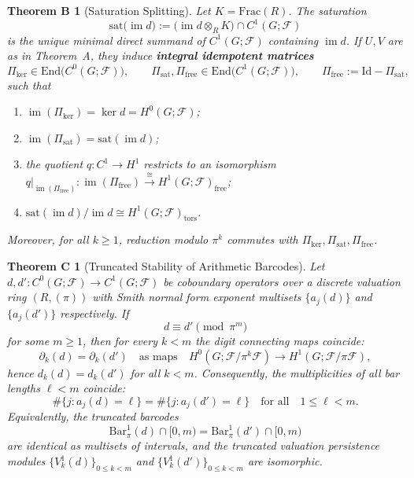 \documentclass[11pt]{amsart}
\theoremstyle{plain}
\newtheorem*{thmB}{Theorem B}
\newtheorem*{thmC}{Theorem C}
\theoremstyle{definition}
\newcommand{\Ring}{R}                          %
\newcommand{\unif}{\pi}                        %
\newcommand{\sheaf}[1]{\mathcal{#1}}                  %
\newcommand{\sat}{\mathrm{sat}}
\newcommand{\free}{\mathrm{free}}
\newcommand{\tors}{\mathrm{tors}}
\newcommand{\Digit}[1]{\partial_{#1}}%
\newcommand{\coboundary}{d}                           %
\DeclareMathOperator{\im}{im}                         %
\begin{document}
\begin{thmB}[Saturation Splitting]
\label{thm:B-saturation}
Let $K=\mathrm{Frac}(\Ring)$. The saturation
\[
\sat\bigl(\im \coboundary\bigr) := \bigl(\im \coboundary \otimes_{\Ring} K\bigr)\cap C^1(G;\sheaf{F})
\]
is the unique minimal direct summand of $C^1(G;\sheaf{F})$ containing $\im \coboundary$. If $U,V$ are as in Theorem~A, they induce \textbf{integral idempotent matrices}
\[
\Pi_{\ker}\in \mathrm{End}\bigl(C^0(G;\sheaf{F})\bigr),\qquad
\Pi_{\sat},\Pi_{\free}\in \mathrm{End}\bigl(C^1(G;\sheaf{F})\bigr),\qquad
\Pi_{\free}:=\mathrm{Id}-\Pi_{\sat},
\]
such that
\begin{enumerate}[label=\textup{(\roman*)}]
\item $\im(\Pi_{\ker})=\ker \coboundary = H^0(G;\sheaf{F})$;
\item $\im(\Pi_{\sat})=\sat(\im \coboundary)$;
\item the quotient $q:C^1\to H^1$ restricts to an isomorphism $q|_{\im(\Pi_{\free})}:\im(\Pi_{\free})\xrightarrow{\;\cong\;} H^1(G;\sheaf{F})_{\free}$;
\item $\sat(\im \coboundary)/\im \coboundary \cong H^1(G;\sheaf{F})_{\tors}$.
\end{enumerate}
Moreover, for all $k\ge 1$, reduction modulo $\unif^k$ commutes with $\Pi_{\ker},\Pi_{\sat},\Pi_{\free}$.
\end{thmB}

\medskip

\begin{thmC}[Truncated Stability of Arithmetic Barcodes]
\label{thm:C-truncated}
Let $\coboundary, \coboundary': C^0(G;\sheaf{F}) \to C^1(G;\sheaf{F})$ be coboundary operators over a discrete valuation ring $(\Ring, (\unif))$ with Smith normal form exponent multisets $\{a_j(d)\}$ and $\{a_j(d')\}$ respectively. If 
\[
\coboundary \equiv \coboundary' \pmod{\unif^m}
\]
for some $m \ge 1$, then for every $k < m$ the digit connecting maps coincide:
\[
\Digit{k}(\coboundary) = \Digit{k}(\coboundary')
\quad\text{as maps}\quad
H^0(G;\sheaf{F}/\unif^k\sheaf{F}) \longrightarrow H^1(G;\sheaf{F}/\unif\sheaf{F}),
\]
hence $d_k(\coboundary) = d_k(\coboundary')$ for all $k < m$. Consequently, the multiplicities of all bar lengths $\ell < m$ coincide:
\[
\#\{j : a_j(\coboundary) = \ell\} = \#\{j : a_j(\coboundary') = \ell\}
\quad\text{for all}\quad 1 \le \ell < m.
\]
Equivalently, the truncated barcodes
\[
\mathrm{Bar}^1_\unif(\coboundary) \cap [0,m) = \mathrm{Bar}^1_\unif(\coboundary') \cap [0,m)
\]
are identical as multisets of intervals, and the truncated valuation persistence modules $\{V^1_k(\coboundary)\}_{0 \le k < m}$ and $\{V^1_k(\coboundary')\}_{0 \le k < m}$ are isomorphic.
\end{thmC}
\end{document}
